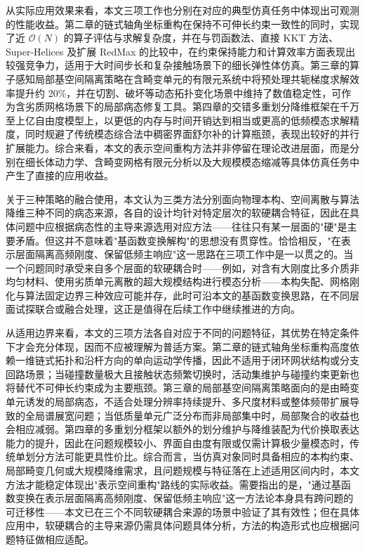 从实际应用效果来看，本文三项工作也分别在对应的典型仿真任务中体现出可观测的性能收益。第二章的链式轴角坐标重构在保持不可伸长约束一致性的同时，实现了近 $\mathcal{O}(N)$ 的算子评估与求解复杂度，并在与罚函数法、直接 KKT 方法、Super-Helices 及扩展 RedMax 的比较中，在约束保持能力和计算效率方面表现出较强竞争力，适用于大时间步长和复杂接触场景下的细长弹性体仿真。第三章的算子感知局部基空间隔离策略在含畸变单元的有限元系统中将预处理共轭梯度求解效率提升约 20\%，并在切割、破坏等动态拓扑变化场景中维持了数值稳定性，可作为含劣质网格场景下的局部病态修复工具。第四章的交错多重划分降维框架在千万至上亿自由度模型上，以更低的内存与时间开销达到相当或更高的低频模态求解精度，同时规避了传统模态综合法中稠密界面舒尔补的计算瓶颈，表现出较好的并行扩展能力。综合来看，本文的表示空间重构方法并非停留在理论改进层面，而是分别在细长体动力学、含畸变网格有限元分析以及大规模模态缩减等具体仿真任务中产生了直接的应用收益。

关于三种策略的融合使用，本文认为三类方法分别面向物理本构、空间离散与算法降维三种不同的病态来源，各自的设计均针对特定层次的软硬耦合特征，因此在具体问题中应根据病态性的主导来源选用对应方法——往往只有某一层面的"硬"是主要矛盾。但这并不意味着"基函数变换解构"的思想没有贯穿性。恰恰相反，"在表示层面隔离高频刚度、保留低频主响应"这一思路在三项工作中是一以贯之的。当一个问题同时承受来自多个层面的软硬耦合时——例如，对含有大刚度比多介质非均匀材料、使用劣质单元离散的超大规模结构进行模态分析——本构失配、网格刚化与算法固定边界三种效应可能并存，此时可沿本文的基函数变换思路，在不同层面试探联合或融合处理，这正是值得在后续工作中继续推进的方向。


从适用边界来看，本文的三项方法各自对应于不同的问题特征，其优势在特定条件下才会充分体现，因而不应被理解为普适方案。第二章的链式轴角坐标重构高度依赖一维链式拓扑和沿杆方向的单向运动学传播，因此不适用于闭环网状结构或分支回路场景；当碰撞数量极大且接触状态频繁切换时，活动集维护与碰撞约束更新也将替代不可伸长约束成为主要瓶颈。第三章的局部基空间隔离策略面向的是由畸变单元诱发的局部病态，不适合处理分辨率持续提升、多尺度材料或整体频带扩展导致的全局谱展宽问题；当低质量单元广泛分布而非局部集中时，局部聚合的收益也会相应减弱。第四章的多重划分框架以额外的划分维护与降维装配为代价换取表达能力的提升，因此在问题规模较小、界面自由度有限或仅需计算极少量模态时，传统单划分方法可能更具性价比。综合而言，当仿真对象同时具备相应的本构约束、局部畸变几何或大规模降维需求，且问题规模与特征落在上述适用区间内时，本文方法才能稳定体现出"表示空间重构"路线的实际收益。需要指出的是，"通过基函数变换在表示层面隔离高频刚度、保留低频主响应"这一方法论本身具有跨问题的可迁移性——本文已在三个不同软硬耦合来源的场景中验证了其有效性；但在具体应用中，软硬耦合的主导来源仍需具体问题具体分析，方法的构造形式也应根据问题特征做相应适配。
